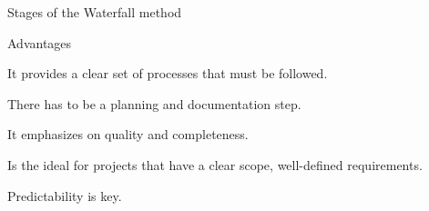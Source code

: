 \begin{frame}{Stages of the Waterfall method}    
    \begin{exampleblock}{Advantages}
        \item It provides a clear set of processes that must be followed.
        
        \item There has to be a planning and documentation step.
        
        \item It emphasizes on quality and completeness.
        
        \item Is the ideal for projects that have a clear scope, well-defined requirements.
        
        \item Predictability is key.
     
    \end{exampleblock}

    \end{frame}
